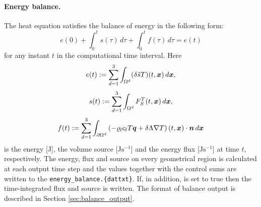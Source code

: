 \paragraph{Energy balance.}
The heat equation satisfies the balance of energy in the following form:
$$ e(0) + \int_0^t s(\tau) \,d\tau + \int_0^t f(\tau) \,d\tau = e(t) $$
for any instant $t$ in the computational time interval.
Here
$$ e(t) := \sum_{d=1}^3\int_{\Omega^d}(\delta \tilde s T)(t,\mathbf{\boldsymbol{x}})\,d\mathbf{\boldsymbol{x}}, $$
$$ s(t) := \sum_{d=1}^3\int_{\Omega^d}F_S^T(t,\mathbf{\boldsymbol{x}})\,d\mathbf{\boldsymbol{x}}, $$
$$ f(t) := \sum_{d=1}^3\int_{\partial\Omega^d}\left(-\varrho_l c_l T\mathbf{\boldsymbol{q}} + \delta\Lambda\nabla T\right)(t,\mathbf{\boldsymbol{x}})\cdot\mathbf{\boldsymbol{n}} \,d\mathbf{\boldsymbol{x}} $$
is the energy [J], the volume source [J$\mathrm{s}^{-1}$] and the energy flux [J$\mathrm{s}^{-1}$] at time $t$, respectively.
The energy, flux and source on every geometrical region is calculated at each output time step and the values together with the control sums are written to the  \texttt{energy\_balance.\{dat\textbar txt\}}.
If, in addition,  is set to true then the time-integrated flux and source is written.
The format of balance output is described in Section \ref{sec:balance_output}.





